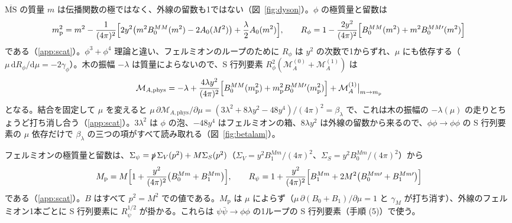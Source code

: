 \documentclass[a4paper,10pt]{ltjsarticle}
\newcommand{\dd}{\mathrm{d}}
\newcommand{\MSbar}{\overline{\mathrm{MS}}}
\begin{document}
$\MSbar$ の質量 $m$ は伝播関数の極ではなく、外線の留数も1ではない（図~\ref{fig:dyson}）。$\phi$ の極質量と留数は
\begin{equation}
m_{\mathrm p}^2=m^2-\frac{1}{(4\pi)^2}\Bigl[2y^2\bigl(m^2B_0^{MM}(m^2)-2A_0(M^2)\bigr)+\frac\lambda2A_0(m^2)\Bigr],\qquad
R_\phi=1-\frac{2y^2}{(4\pi)^2}\Bigl[B_0^{MM}(m^2)+m^2B_0^{MM\prime}(m^2)\Bigr]
\label{eq:mpole}
\end{equation}
である（\ref{app:scat}）。$\phi^3+\phi^4$ 理論と違い、フェルミオンのループのために $R_\phi$ は $y^2$ の次数で1からずれ、$\mu$ にも依存する（$\mu\,\dd R_\phi/\dd\mu=-2\gamma_\phi$）。木の振幅 $-\lambda$ は質量によらないので、S 行列要素 $R_\phi^2(\mathcal M_A^{(0)}+\mathcal M_A^{(1)})$ は
\begin{equation}
\mathcal M_{A,\mathrm{phys}}=-\lambda+\frac{4\lambda y^2}{(4\pi)^2}\Bigl[B_0^{MM}(m_{\mathrm p}^2)+m_{\mathrm p}^2B_0^{MM\prime}(m_{\mathrm p}^2)\Bigr]+\mathcal M_A^{(1)}\big|_{m\to m_{\mathrm p}}
\label{eq:Mphys}
\end{equation}
となる。結合を固定して $\mu$ を変えると $\mu\,\partial\mathcal M_{A,\mathrm{phys}}/\partial\mu=(3\lambda^2+8\lambda y^2-48y^4)/(4\pi)^2=\beta_\lambda$ で、これは木の振幅の $-\lambda(\mu)$ の走りとちょうど打ち消し合う（\ref{app:scat}）。$3\lambda^2$ は $\phi$ の泡、$-48y^4$ はフェルミオンの箱、$8\lambda y^2$ は外線の留数から来るので、$\phi\phi\to\phi\phi$ の S 行列要素の $\mu$ 依存だけで $\beta_\lambda$ の三つの項がすべて読み取れる（図~\ref{fig:betalam}）。

フェルミオンの極質量と留数は、$\Sigma_\psi=\slashed p\,\Sigma_V(p^2)+M\Sigma_S(p^2)$（$\Sigma_V=y^2B_1^{Mm}/(4\pi)^2$、$\Sigma_S=y^2B_0^{Mm}/(4\pi)^2$）から
\begin{equation}
M_{\mathrm p}=M\Bigl[1+\frac{y^2}{(4\pi)^2}\bigl(B_0^{Mm}+B_1^{Mm}\bigr)\Bigr],\qquad
R_\psi=1+\frac{y^2}{(4\pi)^2}\Bigl[B_1^{Mm}+2M^2\bigl(B_0^{Mm\prime}+B_1^{Mm\prime}\bigr)\Bigr]
\label{eq:Mpole}
\end{equation}
である（\ref{app:scat}）。$B$ はすべて $p^2=M^2$ での値である。$M_{\mathrm p}$ は $\mu$ によらず（$\mu\,\partial(B_0+B_1)/\partial\mu=1$ と $\gamma_M$ が打ち消す）、外線のフェルミオン1本ごとに S 行列要素に $R_\psi^{1/2}$ が掛かる。これらは $\psi\bar\psi\to\phi\phi$ の1ループの S 行列要素（手順 (5)）で使う。
\end{document}
